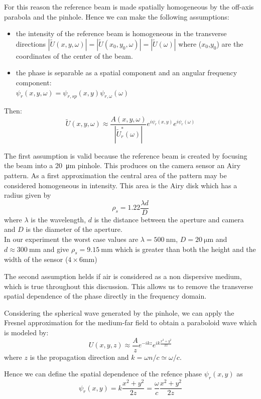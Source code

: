 \documentclass[12pt,a4paper,twoside]{article}
\begin{document}
For this reason the reference beam is made spatially homogeneous by the off-axis parabola and the pinhole.
Hence we can make the following assumptions:
\begin{itemize}
\item the intensity of the reference beam is homogeneous in the transverse directions $|\tilde{U}(x,y,\omega)|=|\tilde{U}(x_0,y_0,\omega)|=|\tilde{U}(\omega)|$ where ($x_0$,$y_0$) are the coordinates of the center of the beam.
\item the phase is separable as a spatial component and an angular frequency component:\\ $\psi_r(x,y,\omega) = \psi_{r,sp}(x,y)\psi_{r,\omega}(\omega)$
\end{itemize}
Then:
\begin{equation}
	\tilde{U}(x,y,\omega) \approx \frac{A(x,y,\omega)}{|\tilde{U}_r^*(\omega)|}e^{i\psi_r(x,y)}e^{i\psi_r(\omega)}
\end{equation}

The first assumption is valid because the reference beam is created by focusing the beam into a \SI{20}{\um} pinhole.
This produces on the camera sensor an Airy pattern.
As a first approximation the central area of the pattern may be considered homogeneous in intensity.
This area is the Airy disk which has a radius given by
$$\rho_s = 1.22 \frac{\lambda d}{D}$$
where $\lambda$ is the wavelength, $d$ is the distance between the aperture and camera and $D$ is the diameter of the aperture.\\
In our experiment the worst case values are $\lambda = \SI{500}{\nm}$, $D = \SI{20}{\um}$ and $d \approx \SI{300}{\mm}$ and give $\rho_s = \SI{9.15}{\mm}$ which is greater than both the height and the width of the sensor ($4 \times 6 \si{\mm}$)

\clearpage
The second assumption helds if air is considered as a non dispersive medium, which is true throughout this discussion.
This allows us to remove the transverse spatial dependence of the phase directly in the frequency domain.

Considering the spherical wave generated by the pinhole, we can apply the Fresnel approximation for the medium-far field to obtain a paraboloid wave which is modeled by:
\begin{equation*}
U(x,y,z) \approx \frac{A}{z}e^{-ikz}e^{ik\frac{x^2+y^2}{2z}}
\end{equation*}
where $z$ is the propagation direction and $k=\omega n/c \simeq \omega/c$.

Hence we can define the spatial dependence of the refence phase $\psi_r(x,y)$ as
\begin{equation}
	\psi_r(x,y) = k\frac{x^2+y^2}{2z} = \frac{\omega}{c}\frac{x^2+y^2}{2z}
\end{equation}
\end{document}
